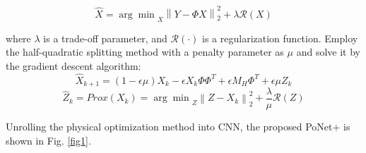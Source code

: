 \documentclass{article}
\begin{document}
\begin{itemize}
{}
\begin{equation}
	\hat{{X}}={\arg\min}_X\left\| Y-\Phi{X}\right\|  _{2}^{2}+\lambda\mathcal{R}({X})
\end{equation}
\par{where $\lambda$ is a trade-off parameter, and $\mathcal{R}(\cdot)$ is a regularization function. Employ the half-quadratic splitting method with a penalty parameter as $\mu$ and solve it by the gradient descent algorithm:
}
\begin{equation} 
\hat{{X}}_{k+1} = \left(1-\epsilon\mu\right){X}_k-\epsilon {X}_k{\Phi}{\Phi}^T+\epsilon {M_H}{\Phi}^T+\epsilon\mu{Z}_k
\end{equation}
\begin{equation}
\hat{{Z}}_{k}={Prox}(X_{k})={\arg\min}_Z\left\|{Z}-{X}_{k}\right\| _{2}^{2}+\frac{\lambda}{\mu}\mathcal{R}({Z})
\label{eq8}
\end{equation}
\par{}
\par{Unrolling the physical optimization method into CNN, the proposed PoNet+ is shown in Fig. \ref{fig1}.
}
           


\end{itemize}
\end{document}

